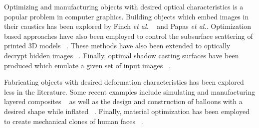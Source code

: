\documentclass[annual]{acmsiggraph}
\begin{document}
Optimizing and manufacturing objects with desired optical characteristics is a popular problem in computer graphics. Building objects which embed images in their caustics has been explored by Finch \textit{et al.} ~ and Papas \textit{et al.}. Optimization based approaches have also been employed to control the subsurface scattering of printed 3D models ~\cite{Hasan:2010}. These methods have also been extended to optically decrypt hidden images ~\cite{Papas:2012}. Finally, optimal shadow casting surfaces have been produced which emulate a given set of input images ~\cite{Bermano:2012}.

Fabricating objects with desired deformation characteristics has been explored less in the literature. Some recent examples include simulating and manufacturing layered composites ~\cite{Bickel:2010} as well as the design and construction of balloons with a desired shape while inflated ~\cite{sko:2012}. Finally, material optimization has been employed to create mechanical clones of human faces ~\cite{Bickel:2012}.
\end{document}
